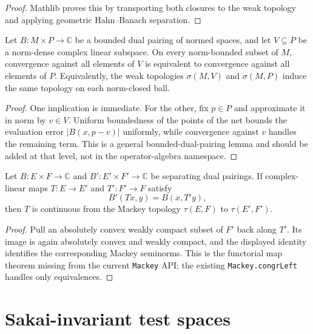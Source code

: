 \begin{proof}
  \leanok
  Mathlib proves this by transporting both closures to the weak topology and applying geometric
  Hahn--Banach separation.
\end{proof}

\begin{lemma}
  \label{lem:bounded_weak_topologies_agree}
  \leanok
  Let $B:M\times P\to\mathbb C$ be a bounded dual pairing of normed spaces, and let
  $V\subseteq P$ be a norm-dense complex linear subspace.  On every norm-bounded subset of $M$,
  convergence against all elements of $V$ is equivalent to convergence against all elements of
  $P$.  Equivalently, the weak topologies $\sigma(M,V)$ and $\sigma(M,P)$ induce the same topology
  on each norm-closed ball.
\end{lemma}

\begin{proof}
  \leanok
  One implication is immediate.  For the other, fix $p\in P$ and approximate it in norm by
  $v\in V$.  Uniform boundedness of the points of the net bounds the evaluation error
  $|B(x,p-v)|$ uniformly, while convergence against $v$ handles the remaining term.  This is a
  general bounded-dual-pairing lemma and should be added at that level, not in the operator-algebra
  namespace.
\end{proof}

\begin{lemma}
  \label{lem:mackey_continuous_of_dual_map}
  \leanok
  Let $B:E\times F\to\mathbb C$ and $B':E'\times F'\to\mathbb C$ be separating dual pairings.  If
  complex-linear maps $T:E\to E'$ and $T':F'\to F$ satisfy
  \[
    B'(Tx,y)=B(x,T'y),
  \]
  then $T$ is continuous from the Mackey topology $\tau(E,F)$ to
  $\tau(E',F')$.
\end{lemma}

\begin{proof}
  \leanok
  Pull an absolutely convex weakly compact subset of $F'$ back along $T'$.  Its image is again
  absolutely convex and weakly compact, and the displayed identity identifies the corresponding
  Mackey seminorms.  This is the functorial map theorem missing from the current \texttt{Mackey}
  API; the existing \texttt{Mackey.congrLeft} handles only equivalences.
\end{proof}

\section{Sakai-invariant test spaces}

